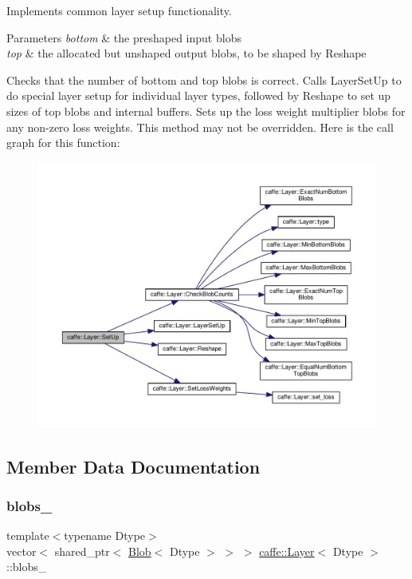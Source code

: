 Implements common layer setup functionality. 


\begin{DoxyParams}{Parameters}
{\em bottom} & the preshaped input blobs \\
\hline
{\em top} & the allocated but unshaped output blobs, to be shaped by Reshape\\
\hline
\end{DoxyParams}
Checks that the number of bottom and top blobs is correct. Calls Layer\+Set\+Up to do special layer setup for individual layer types, followed by Reshape to set up sizes of top blobs and internal buffers. Sets up the loss weight multiplier blobs for any non-\/zero loss weights. This method may not be overridden. Here is the call graph for this function\+:
\nopagebreak
\begin{figure}[H]
\begin{center}
\leavevmode
\includegraphics[width=350pt]{classcaffe_1_1_layer_a18d6bfdb535ab8e96a971dec4ae39a84_cgraph}
\end{center}
\end{figure}


\subsection{Member Data Documentation}
\mbox{\label{classcaffe_1_1_layer_a8d6998a5f8ca95990976021de743dd21}} 
\subsubsection{\texorpdfstring{blobs\+\_\+}{blobs\_}}
{\footnotesize\ttfamily template$<$typename Dtype$>$ \\
vector$<$ shared\+\_\+ptr$<$ \mbox{\hyperlink{classcaffe_1_1_blob}{Blob}}$<$ Dtype $>$ $>$ $>$ \mbox{\hyperlink{classcaffe_1_1_layer}{caffe\+::\+Layer}}$<$ Dtype $>$\+::blobs\+\_\+\hspace{0.3cm}{\ttfamily [protected]}}

